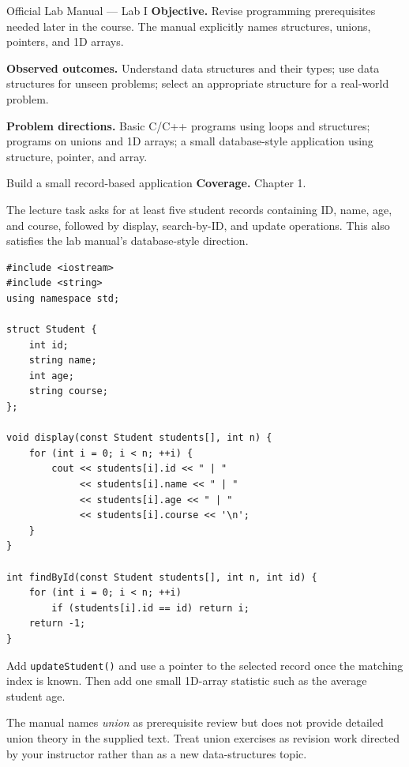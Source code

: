 
\begin{sourcealignment}{Official Lab Manual --- Lab I}
\textbf{Objective.} Revise programming prerequisites needed later in the course. The manual explicitly names structures, unions, pointers, and 1D arrays.

\textbf{Observed outcomes.} Understand data structures and their types; use data structures for unseen problems; select an appropriate structure for a real-world problem.

\textbf{Problem directions.} Basic C/C++ programs using loops and structures; programs on unions and 1D arrays; a small database-style application using structure, pointer, and array.
\end{sourcealignment}

\begin{labproject}{Build a small record-based application}
\textbf{Coverage.} Chapter 1.

The lecture task asks for at least five student records containing ID, name, age, and course, followed by display, search-by-ID, and update operations. This also satisfies the lab manual's database-style direction.

\begin{lstlisting}
#include <iostream>
#include <string>
using namespace std;

struct Student {
    int id;
    string name;
    int age;
    string course;
};

void display(const Student students[], int n) {
    for (int i = 0; i < n; ++i) {
        cout << students[i].id << " | "
             << students[i].name << " | "
             << students[i].age << " | "
             << students[i].course << '\n';
    }
}

int findById(const Student students[], int n, int id) {
    for (int i = 0; i < n; ++i)
        if (students[i].id == id) return i;
    return -1;
}
\end{lstlisting}

\begin{tryit}
Add \texttt{updateStudent()} and use a pointer to the selected record once the matching index is known. Then add one small 1D-array statistic such as the average student age.
\end{tryit}

\begin{labmode}
The manual names \emph{union} as prerequisite review but does not provide detailed union theory in the supplied text. Treat union exercises as revision work directed by your instructor rather than as a new data-structures topic.
\end{labmode}
\end{labproject}

